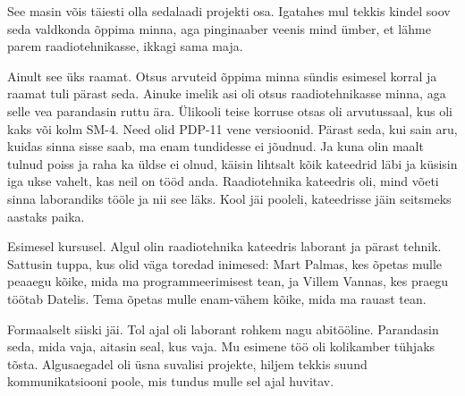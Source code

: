 See masin võis täiesti olla sedalaadi projekti osa. Igatahes mul tekkis kindel soov seda valdkonda
õppima minna, aga pinginaaber veenis mind ümber, et lähme parem 
raadiotehnikasse, ikkagi sama maja.


Ainult see üks raamat. Otsus arvuteid õppima minna sündis esimesel korral ja raamat tuli 
pärast seda. Ainuke imelik asi oli otsus raadiotehnikasse 
minna, aga selle vea parandasin ruttu ära. Ülikooli teise korruse otsas oli arvutussaal, kus oli kaks või 
kolm SM-4. Need olid PDP-11 vene 
versioonid. Pärast seda, kui sain aru, kuidas sinna sisse saab, ma enam 
tundidesse ei jõudnud. Ja kuna olin maalt tulnud poiss ja raha ka üldse ei olnud, 
käisin lihtsalt kõik kateedrid läbi ja küsisin iga ukse vahelt, kas neil on tööd anda. Raadiotehnika kateedris\label{sisu!mast_raadiotehnikas} oli, 
mind võeti sinna laborandiks tööle ja nii see läks. Kool jäi pooleli, kateedrisse
jäin seitsmeks aastaks paika.


Esimesel kursusel. Algul olin raadiotehnika kateedris laborant ja pärast 
tehnik. Sattusin tuppa, kus olid väga toredad inimesed: Mart 
Palmas, kes õpetas mulle peaaegu kõike, mida ma 
programmeerimisest tean, ja Villem 
Vannas, kes praegu töötab Datelis. Tema 
õpetas mulle enam-vähem kõike, mida ma rauast tean.


Formaalselt siiski jäi. Tol ajal oli
laborant rohkem nagu abitööline. 
Parandasin seda, mida vaja, aitasin seal, kus vaja. Mu esimene töö oli 
kolikamber tühjaks tõsta.
Algusaegadel oli üsna suvalisi projekte, hiljem tekkis
suund kommunikatsiooni poole, mis tundus mulle sel ajal huvitav. 

